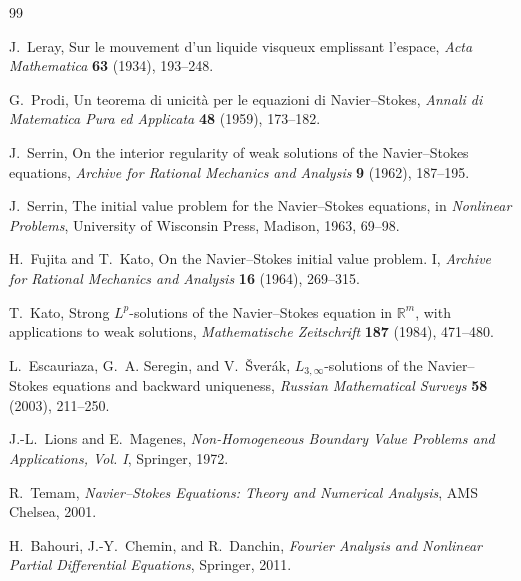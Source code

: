 \documentclass[11pt,letterpaper]{article}
\theoremstyle{definition}
\theoremstyle{remark}
\begin{document}
\begingroup
\small
\begin{thebibliography}{99}

J.~Leray,
\newblock Sur le mouvement d'un liquide visqueux emplissant l'espace,
\newblock \emph{Acta Mathematica} \textbf{63} (1934), 193--248.

G.~Prodi,
\newblock Un teorema di unicit\`a per le equazioni di
{Navier{--}\hspace{0pt}Stokes},
\newblock \emph{Annali di Matematica Pura ed Applicata} \textbf{48}
(1959), 173--182.

J.~Serrin,
\newblock On the interior regularity of weak solutions of the
{Navier{--}\hspace{0pt}Stokes} equations,
\newblock \emph{Archive for Rational Mechanics and Analysis} \textbf{9}
(1962), 187--195.

J.~Serrin,
\newblock The initial value problem for the {Navier{--}\hspace{0pt}Stokes} equations,
\newblock in \emph{Nonlinear Problems}, University of Wisconsin Press,
Madison, 1963, 69--98.

H.~Fujita and T.~Kato,
\newblock On the {Navier{--}\hspace{0pt}Stokes} initial value problem. I,
\newblock \emph{Archive for Rational Mechanics and Analysis} \textbf{16}
(1964), 269--315.

T.~Kato,
\newblock Strong \(L^p\)-solutions of the {Navier{--}\hspace{0pt}Stokes} equation in
\(\mathbb R^m\), with applications to weak solutions,
\newblock \emph{Mathematische Zeitschrift} \textbf{187} (1984), 471--480.

L.~Escauriaza, G.~A. Seregin, and V.~\v{S}ver\'ak,
\newblock \(L_{3,\infty}\)-solutions of the {Navier{--}\hspace{0pt}Stokes} equations
and backward uniqueness,
\newblock \emph{Russian Mathematical Surveys} \textbf{58} (2003),
211--250.

J.-L.~Lions and E.~Magenes,
\newblock \emph{Non-Homogeneous Boundary Value Problems and Applications,
Vol. I},
\newblock Springer, 1972.

R.~Temam,
\newblock \emph{{Navier{--}\hspace{0pt}Stokes} Equations: Theory and Numerical
Analysis},
\newblock AMS Chelsea, 2001.

H.~Bahouri, J.-Y.~Chemin, and R.~Danchin,
\newblock \emph{Fourier Analysis and Nonlinear Partial Differential
Equations},
\newblock Springer, 2011.

\end{thebibliography}
\endgroup
\end{document}
